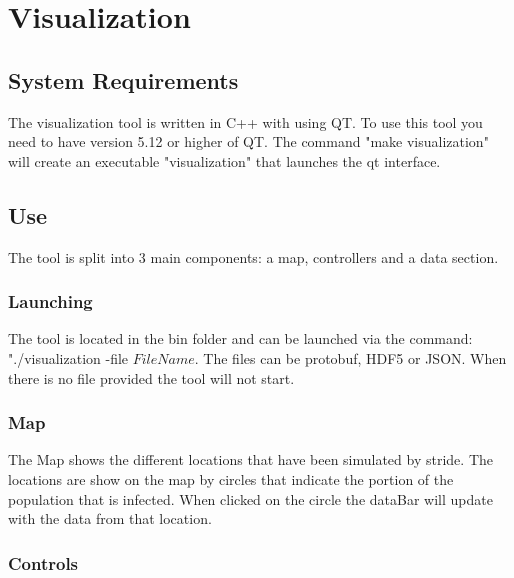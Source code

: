 \chapter{Visualization}
\label{chap:visualization}

\section{System Requirements}
\label{section:system requirements}

The visualization tool is written in C++ with using QT. To use this tool you need to have version 5.12 or higher of QT.
The command "make visualization" will create an executable "visualization" that launches the qt interface. 

\section{Use}
\label{section:Use}

The tool is split into 3 main components: a map, controllers and a data section.

\subsection{Launching}
The tool is located in the bin folder and can be launched via the command: "./visualization -file $FileName$.
The files can be protobuf, HDF5 or JSON. When there is no file provided the tool will not start.

\subsection{Map}

The Map shows the different locations that have been simulated by stride. The locations are show on the map by circles that indicate the portion of the population that is infected. When clicked on the circle the dataBar will update with the data from that location.


\subsection{Controls}

